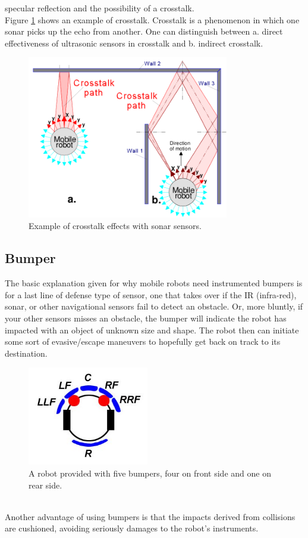 specular reflection and the possibility of a crosstalk.
\\
Figure \ref{fig:sonar_crosstalk} shows an example of crosstalk.
Crosstalk is a phenomenon in which one sonar picks up the echo
from another. One can distinguish between a. direct effectiveness
of ultrasonic sensors in crosstalk and b. indirect crosstalk.
\begin{figure} [h]
  \begin{center}
    \includegraphics[width=250pt]{img/sonar_crosstalk.png}
    \caption{Example of crosstalk effects with sonar sensors.}
    \label{fig:sonar_crosstalk}
  \end{center}
\end{figure}

\subsection{Bumper}
\label{intro:mobile:bumper}

The basic explanation given for why mobile robots need instrumented
bumpers is for a last line of defense type of sensor, one that takes
over if the IR (infra-red), sonar, or other navigational sensors fail
to detect an obstacle. Or, more bluntly, if your other sensors misses
an obstacle, the bumper will indicate the robot has impacted with an
object of unknown size and shape. The robot then can initiate some
sort of evasive/escape maneuvers to
hopefully get back on track to its destination.
\begin{figure} [h]
  \begin{center}
    \includegraphics[width=200px]{img/bumpers.jpg}
    \caption{A robot provided with five bumpers, four on front
      side and one on rear side.}
    \label{fig:bumpers}
  \end{center}
\end{figure}
\\
Another advantage of using bumpers is that the impacts derived from
collisions are cushioned, avoiding seriously damages to the robot's
instruments.

